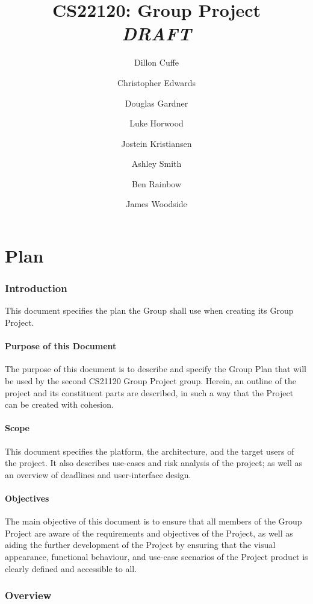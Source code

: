 \documentclass[12pt,a4paper,titlepage,onecolumn,draft]{report}
\title{CS22120: Group Project \\ \emph{DRAFT}}
\author{
 Dillon Cuffe \and
  Christopher Edwards \and
  Douglas Gardner \and
  Luke Horwood \and
  Jostein Kristiansen \and
  Ashley Smith \and
  Ben Rainbow \and
  James Woodside
}
\begin{document}
\maketitle
\tableofcontents

\part{Plan} %

\section{Introduction}
This document specifies the plan the Group shall use when creating its Group
Project.

\subsection{Purpose of this Document}
The purpose of this document is to describe and specify the Group Plan that will
be used by the second CS21120 Group Project group. Herein, an outline of the
project and its constituent parts are described, in such a way that the Project
can be created with cohesion.

\subsection{Scope}
This document specifies the platform, the architecture, and the target users of
the project. It also describes use-cases and risk analysis of the project; as
well as an overview of deadlines and user-interface design.

\subsection{Objectives}
The main objective of this document is to ensure that all members of the Group
Project are aware of the requirements and objectives of the Project, as well as
aiding the further development of the Project by ensuring that the visual
appearance, functional behaviour, and use-case scenarios of the Project product
is clearly defined and accessible to all.


\section{Overview}
\end{document}
